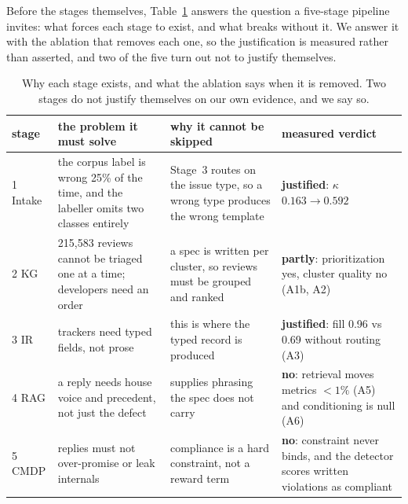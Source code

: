 \documentclass[sigconf, anonymous]{acmart}
\begin{document}
Before the stages themselves, Table~\ref{tab:why-stages} answers the question a five-stage
pipeline invites: what forces each stage to exist, and what breaks without it. We answer it with
the ablation that removes each one, so the justification is measured rather than asserted, and
two of the five turn out not to justify themselves.

\begin{table}[t]\centering\footnotesize
\caption{Why each stage exists, and what the ablation says when it is removed. Two stages do not
justify themselves on our own evidence, and we say so.}\label{tab:why-stages}
\begin{tabular}{@{}p{1.5cm}p{3.4cm}p{3.4cm}p{2.6cm}@{}}\toprule
stage & the problem it must solve & why it cannot be skipped & measured verdict \\\midrule
1 Intake & the corpus label is wrong 25\% of the time, and the labeller omits two classes entirely & Stage~3 routes on the issue type, so a wrong type produces the wrong template & \textbf{justified}: $\kappa$ $0.163 \to 0.592$ \\
2 KG & 215{,}583 reviews cannot be triaged one at a time; developers need an order & a spec is written per cluster, so reviews must be grouped and ranked & \textbf{partly}: prioritization yes, cluster quality no (A1b, A2) \\
3 IR & trackers need typed fields, not prose & this is where the typed record is produced & \textbf{justified}: fill 0.96 vs 0.69 without routing (A3) \\
4 RAG & a reply needs house voice and precedent, not just the defect & supplies phrasing the spec does not carry & \textbf{no}: retrieval moves metrics $<1\%$ (A5) and conditioning is null (A6) \\
5 CMDP & replies must not over-promise or leak internals & compliance is a hard constraint, not a reward term & \textbf{no}: constraint never binds, and the detector scores written violations as compliant \\
\bottomrule\end{tabular}\end{table}
\end{document}
